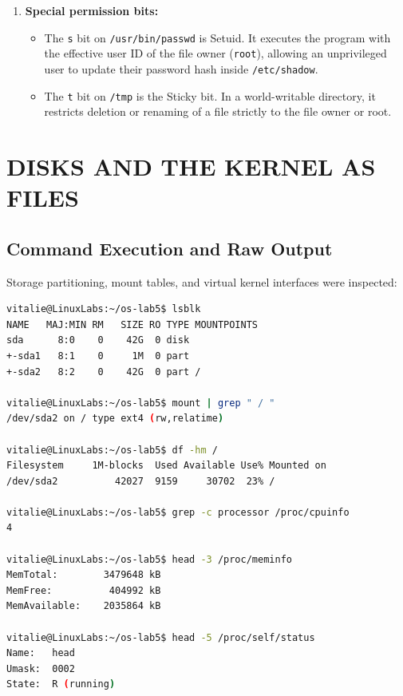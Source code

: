 \documentclass[12pt,a4paper]{report}
\numberwithin{equation}{chapter}
\numberwithin{figure}{chapter}
\numberwithin{table}{chapter}
\begin{document}
\begin{enumerate}
\begin{itemize}
    \end{itemize}
    \item \textbf{Special permission bits:}
    \begin{itemize}
        \item The \texttt{s} bit on \texttt{/usr/bin/passwd} is Setuid. It executes the program with the effective user ID of the file owner (\texttt{root}), allowing an unprivileged user to update their password hash inside \texttt{/etc/shadow}.
        \item The \texttt{t} bit on \texttt{/tmp} is the Sticky bit. In a world-writable directory, it restricts deletion or renaming of a file strictly to the file owner or root.
    \end{itemize}
\end{enumerate}

\chapter{DISKS AND THE KERNEL AS FILES}

\section{Command Execution and Raw Output}
Storage partitioning, mount tables, and virtual kernel interfaces were inspected:
\begin{lstlisting}[language=bash]
vitalie@LinuxLabs:~/os-lab5$ lsblk
NAME   MAJ:MIN RM   SIZE RO TYPE MOUNTPOINTS
sda      8:0    0    42G  0 disk 
+-sda1   8:1    0     1M  0 part 
+-sda2   8:2    0    42G  0 part /

vitalie@LinuxLabs:~/os-lab5$ mount | grep " / "
/dev/sda2 on / type ext4 (rw,relatime)

vitalie@LinuxLabs:~/os-lab5$ df -hm /
Filesystem     1M-blocks  Used Available Use% Mounted on
/dev/sda2          42027  9159     30702  23% /

vitalie@LinuxLabs:~/os-lab5$ grep -c processor /proc/cpuinfo
4

vitalie@LinuxLabs:~/os-lab5$ head -3 /proc/meminfo
MemTotal:        3479648 kB
MemFree:          404992 kB
MemAvailable:    2035864 kB

vitalie@LinuxLabs:~/os-lab5$ head -5 /proc/self/status
Name:   head
Umask:  0002
State:  R (running)
\end{lstlisting}
\end{document}
